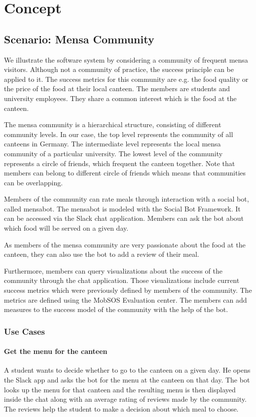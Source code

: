 \chapter{Concept}\label{cha:concept}
\section{Scenario: Mensa Community}
We illustrate the software system by considering a community of frequent mensa visitors.
Although not a community of practice, the success principle can be applied to it.
The success metrics for this community are e.g. the food quality or the price of the food at their local canteen.
The members are students and university employees.
They share a common interest which is the food at the canteen.

The mensa community is a hierarchical structure, consisting of different community levels.
In our case, the top level represents the community of all canteens in Germany.
The intermediate level represents the local mensa community of a particular university.
The lowest level of the community represents a circle of friends, which frequent the canteen together. Note that members can belong to different circle of friends which means that communities can be overlapping.

Members of the community can rate meals through interaction with a social bot, called mensabot. The mensabot is modeled with  the Social Bot Framework. It can be accessed via the Slack chat application. Members can ask the bot about which food will be served on a given day.

As members of the mensa community are very passionate about the food at the canteen, they can also use the bot to add a review of their meal.

Furthermore, members can query visualizations about the success of the community through the chat application. Those visualizations include current success metrics which were previously defined by members of the community. The metrics are defined using the MobSOS Evaluation center. The members can add measures to the success model of the community with the help of the bot.

\subsection{Use Cases}

\subsubsection{Get the menu for the canteen} A student wants to decide whether to go to the canteen on a given day. He opens the Slack app and asks the bot for the menu at the canteen on that day. The bot looks up the menu for that canteen and the resulting menu is then displayed inside the chat along with an average rating of reviews made by the community. The reviews help the student to make a decision about which meal to choose.

